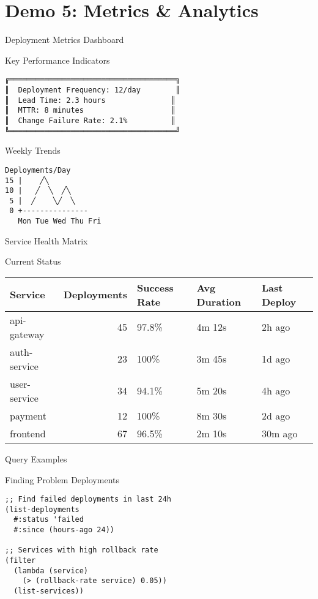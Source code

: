 \documentclass[presentation]{beamer}
\begin{document}
\section{Demo 5: Metrics \& Analytics}
\label{sec:orgc5267ab}
\begin{frame}[label={sec:org59d6e73},fragile]{Deployment Metrics Dashboard}
 \begin{block}{Key Performance Indicators}
\begin{verbatim}
╔══════════════════════════════════════╗
║  Deployment Frequency: 12/day        ║
║  Lead Time: 2.3 hours               ║
║  MTTR: 8 minutes                    ║
║  Change Failure Rate: 2.1%          ║
╚══════════════════════════════════════╝
\end{verbatim}
\end{block}
\begin{block}{Weekly Trends}
\begin{verbatim}
Deployments/Day
15 |    ╱╲
10 |   ╱  ╲  ╱╲
 5 |  ╱    ╲╱  ╲
 0 +---------------
   Mon Tue Wed Thu Fri
\end{verbatim}
\end{block}
\end{frame}
\begin{frame}[label={sec:org510d363}]{Service Health Matrix}
\begin{block}{Current Status}
\begin{center}
\begin{tabular}{lrlll}
Service & Deployments & Success Rate & Avg Duration & Last Deploy\\
\hline
api-gateway & 45 & 97.8\% & 4m 12s & 2h ago\\
auth-service & 23 & 100\% & 3m 45s & 1d ago\\
user-service & 34 & 94.1\% & 5m 20s & 4h ago\\
payment & 12 & 100\% & 8m 30s & 2d ago\\
frontend & 67 & 96.5\% & 2m 10s & 30m ago\\
\end{tabular}
\end{center}
\end{block}
\end{frame}
\begin{frame}[label={sec:org7549a59},fragile]{Query Examples}
 \begin{block}{Finding Problem Deployments}
\begin{verbatim}
;; Find failed deployments in last 24h
(list-deployments
  #:status 'failed
  #:since (hours-ago 24))

;; Services with high rollback rate
(filter
  (lambda (service)
    (> (rollback-rate service) 0.05))
  (list-services))
\end{verbatim}
\end{block}
\end{frame}
\end{document}
